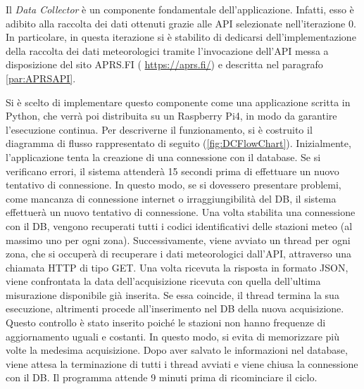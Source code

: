 Il \textit{Data Collector} è un componente fondamentale dell'applicazione. Infatti, esso è adibito alla raccolta dei dati ottenuti grazie alle API selezionate nell'iterazione 0. In particolare, in questa iterazione si è stabilito di dedicarsi dell'implementazione della raccolta dei dati meteorologici tramite l'invocazione dell'API messa a disposizione del sito APRS.FI ( \url{https://aprs.fi/}) e descritta nel paragrafo \ref{par:APRSAPI}. 

Si è scelto di implementare questo componente come una applicazione scritta in Python, che verrà poi distribuita su un Raspberry Pi4, in modo da garantire l'esecuzione continua. Per descriverne il funzionamento, si è costruito il diagramma di flusso rappresentato di seguito (\Fig\ref{fig:DCFlowChart}). Inizialmente, l'applicazione tenta la creazione di una connessione con il database. Se si verificano errori, il sistema attenderà 15 secondi prima di effettuare un nuovo tentativo di connessione. In questo modo, se si dovessero presentare problemi, come mancanza di connessione internet o irraggiungibilità del DB, il sistema effettuerà un nuovo tentativo di connessione. Una volta stabilita una connessione con il DB, vengono recuperati tutti i codici identificativi delle stazioni meteo (al massimo uno per ogni zona). Successivamente, viene avviato un thread per ogni zona, che si occuperà di recuperare i dati meteorologici dall'API, attraverso una chiamata HTTP di tipo GET. Una volta ricevuta la risposta in formato JSON, viene confrontata la data dell'acquisizione ricevuta con quella dell'ultima misurazione disponibile già inserita. Se essa coincide, il thread termina la sua esecuzione, altrimenti procede all'inserimento nel DB della nuova acquisizione. Questo controllo è stato inserito poiché le stazioni non hanno frequenze di aggiornamento uguali e costanti. In questo modo, si evita di memorizzare più volte la medesima acquisizione. Dopo aver salvato le informazioni nel database, viene attesa la terminazione di tutti i thread avviati e viene chiusa la connessione con il DB. Il programma attende 9 minuti prima di ricominciare il ciclo. 

